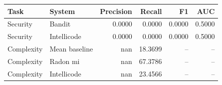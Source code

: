 \begin{tabular}{llrrrr}
\toprule
Task & System & Precision & Recall & F1 & AUC \\
\midrule
Security & Bandit & 0.0000 & 0.0000 & 0.0000 & 0.5000 \\
Security & Intellicode & 0.0000 & 0.0000 & 0.0000 & 0.5000 \\
Complexity & Mean baseline & nan & 18.3699 & -- & -- \\
Complexity & Radon mi & nan & 67.3786 & -- & -- \\
Complexity & Intellicode & nan & 23.4566 & -- & -- \\
\bottomrule
\end{tabular}